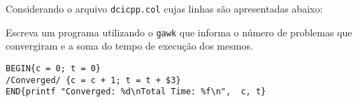 \begin{Exercise}[label={0007}, difficulty={2}, origin={gawk}]
  Considerando o arquivo \lstinline+dcicpp.col+ cujas linhas são
  apresentadas abaixo:
  
  Escreva um programa utilizando o \lstinline+gawk+ que informa o número de
  problemas que convergiram e a soma do tempo de execução dos mesmos.
\end{Exercise}
\begin{Answer}[ref={007}]
  \begin{lstlisting}
BEGIN{c = 0; t = 0}
/Converged/ {c = c + 1; t = t + $3}
END{printf "Converged: %d\nTotal Time: %f\n",  c, t}
  \end{lstlisting}
\end{Answer}
